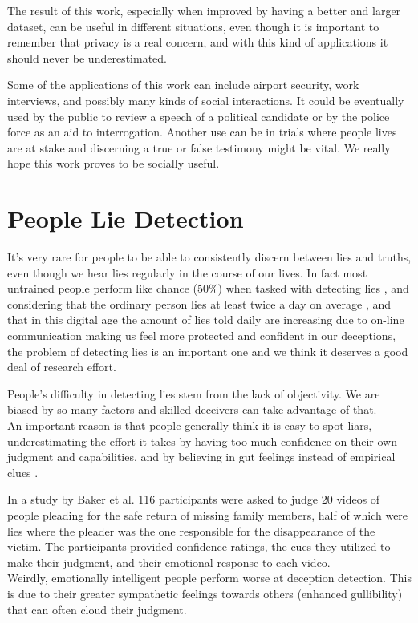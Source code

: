 The result of this work, especially when improved by having a better and larger dataset, can be useful in different situations, even though it is important to remember that privacy is a real concern, and with this kind of applications it should never be underestimated.

Some of the applications of this work can include airport security, work interviews, and possibly many kinds of social interactions. It could be eventually used by the public to review a speech of a political candidate or by the police force as an aid to interrogation. Another use can be in trials where people lives are at stake and discerning a true or false testimony might be vital. We really hope this work proves to be socially useful.

\clearpage

\section{People Lie Detection} \label{pplLieDet}
It's very rare for people to be able to consistently discern between lies and truths, even though we hear lies regularly in the course of our lives. In fact most untrained people perform like chance (50\%) when tasked with detecting lies \cite{Porter2012SecretsAL}, and considering that the ordinary person lies at least twice a day on average \cite{LyingEverydayLife}, and that in this digital age the amount of lies told daily are increasing \cite{DigitalDeception} due to on-line communication making us feel more protected and confident in our deceptions, the problem of detecting lies is an important one and we think it deserves a good deal of research effort. 

People's difficulty in detecting lies stem from the lack of objectivity. We are biased by so many factors and skilled deceivers can take advantage of that. \\
An important reason is that people generally think it is easy to spot liars, underestimating the effort it takes by having too much confidence on their own judgment and capabilities, and by believing in gut feelings instead of empirical clues \cite{VrijDLD}. 

In a study by Baker et al.  \cite{EmotionallyIntelligent} 116 participants were asked to judge 20 videos of people pleading for the safe return of missing family members, half of which were lies where the pleader was the one responsible for the disappearance of the victim. The participants provided confidence ratings, the cues they utilized to make their judgment, and their emotional response to each video.\\
Weirdly, emotionally intelligent people perform worse at deception detection. This is due to their greater sympathetic feelings towards others (enhanced gullibility) that can often cloud their judgment.

